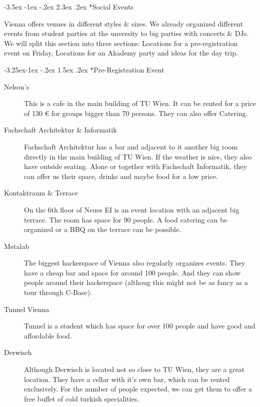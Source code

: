 \documentclass[10pt,a4paper]{article}
\makeatletter
\renewcommand\section{%
\@startsection{section}{1}{\z@}%
              {-3.5ex \@plus -1ex \@minus -.2ex}%
              {2.3ex \@plus.2ex}%
              {\color{kdelight}\sffamily\LARGE\bfseries}}
\renewcommand\subsection{%
\@startsection{subsection}{2}{\z@}%
              {-3.25ex\@plus -1ex \@minus -.2ex}%
              {1.5ex \@plus .2ex}%
              {\color{kdelight}\sffamily\Large\bfseries}}
\makeatother
\begin{document}
\newpage

\section*{Social Events}
Vienna offers venues in different styles \& sizes. We already organized different events from student parties at the unversity to big parties with concerts \& DJs.
We will split this section into three sections: Locations for a pre-registration event on Friday, Locations for an Akademy party and ideas for the day trip.


\subsection*{Pre-Registration Event}

\begin{description}
\item[\color{kdedarker} Nelson's] This is a cafe in the main building of TU Wien. It can be rented for a price of 130 \euro{} for groups bigger than 70 persons. They can also offer Catering.
\item[\color{kdedarker} Fachschaft Architektur \& Informatik] Fachschaft Architektur has a bar and adjacent to it another big room directly in the main building of TU Wien. If the weather is nice, they also have outside seating. Alone or together with Fachschaft Informatik, they can offer us their space, drinks and maybe food for a low price.
\item[\color{kdedarker} Kontaktraum \& Terrace] On the 6th floor of Neues EI is an event location with an adjacent big terrace. The room has space for 90 people. A food catering can be organized or a BBQ on the terrace can be possible.
\item[\color{kdedarker} Metalab] The biggest hackerspace of Vienna also regularly organizes events. They have a cheap bar and space for around 100 people. And they can show people around their hackerspace (althoug this might not be as fancy as a tour through C-Base).
\item[\color{kdedarker} Tunnel Vienna] Tunnel is a student which has space for over 100 people and have good and affordable food.
\item[\color{kdedarker} Derwisch] Although Derwisch is located not so close to TU Wien, they are a great location. They have a cellar with it's own bar, which can be rented exclusively. For the number of people expected, we can get them to offer a free buffet of cold turkish specialities.
\end{description}
\end{document}
